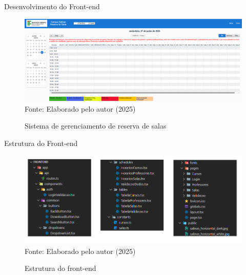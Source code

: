 \begin{frame}{Desenvolvimento do Front-end}
    \begin{figure}
        \centering
        \vspace{-0.5cm}
        \caption{Sistema de gerenciamento de reserva de salas}
        \vspace{-0.2cm}
        \includegraphics[width=1\textwidth]{figuras/front-13.png}
        \\ %
        \footnotesize Fonte: Elaborado pelo autor (2025)
    \end{figure}
\end{frame}

\begin{frame}{Estrutura do Front-end}
    \begin{figure}
        \centering
        \vspace{-0.5cm}
        \caption{Estrutura do front-end}
        \vspace{-0.2cm}
        \includegraphics[width=1\textwidth]{figuras/front-14.png}
        \\ %
        \footnotesize Fonte: Elaborado pelo autor (2025)
    \end{figure}
\end{frame}


